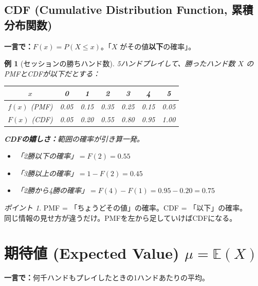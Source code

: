 \documentclass{article}
\newcommand{\E}{\mathbb{E}}
\newtheorem{example}{例}[section]
\theoremstyle{remark}
\newtheorem*{point}{ポイント}
\begin{document}
\subsection{CDF (Cumulative Distribution Function, 累積分布関数)}

\textbf{一言で：}$F(x) = P(X \le x)$。「$X$ がその値\textbf{以下}の確率」。

\begin{example}[セッションの勝ちハンド数]
  5ハンドプレイして、勝ったハンド数 $X$ のPMFとCDFが以下だとする：
  \begin{center}
    \begin{tabular}{c|cccccc}
      $x$          & 0    & 1    & 2    & 3    & 4    & 5 \\ \hline
      $f(x)$ (PMF) & 0.05 & 0.15 & 0.35 & 0.25 & 0.15 & 0.05 \\ \hline
      $F(x)$ (CDF) & 0.05 & 0.20 & 0.55 & 0.80 & 0.95 & 1.00
    \end{tabular}
  \end{center}

  \textbf{CDFの嬉しさ：}範囲の確率が引き算一発。
  \begin{itemize}
    \item 「2勝以下の確率」$= F(2) = 0.55$
    \item 「3勝以上の確率」$= 1 - F(2) = 0.45$
    \item 「2勝から4勝の確率」$= F(4) - F(1) = 0.95 - 0.20 = 0.75$
  \end{itemize}
\end{example}

\begin{point}
  PMF = 「ちょうどその値」の確率。CDF = 「以下」の確率。\\
  同じ情報の見せ方が違うだけ。PMFを左から足していけばCDFになる。
\end{point}

\section{期待値 (Expected Value) $\mu = \E(X)$}

\textbf{一言で：}何千ハンドもプレイしたときの1ハンドあたりの平均。
\end{document}
